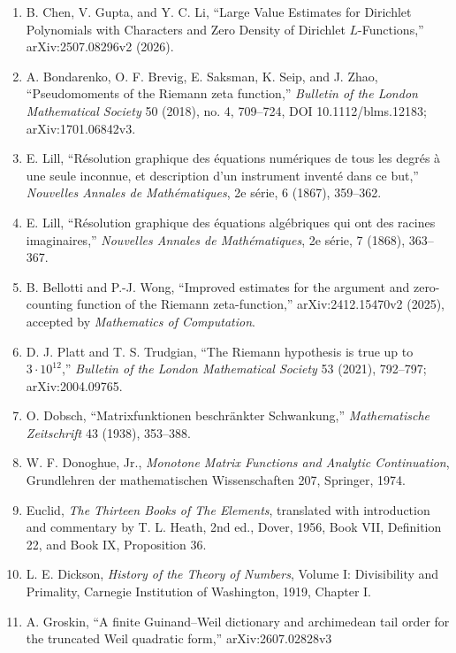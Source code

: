 \documentclass[
  11pt,
]{book}
\begin{document}
\begin{enumerate}
  polynomials,'' \emph{Annals of Mathematics} 203 (2026), no. 2,
  623--675, DOI 10.4007/annals.2026.203.2.6; arXiv:2405.20552v2.
\item
  B. Chen, V. Gupta, and Y. C. Li, ``Large Value Estimates for Dirichlet
  Polynomials with Characters and Zero Density of Dirichlet
  \(L\)-Functions,'' arXiv:2507.08296v2 (2026).
\item
  A. Bondarenko, O. F. Brevig, E. Saksman, K. Seip, and J. Zhao,
  ``Pseudomoments of the Riemann zeta function,'' \emph{Bulletin of the
  London Mathematical Society} 50 (2018), no. 4, 709--724, DOI
  10.1112/blms.12183; arXiv:1701.06842v3.
\item
  E. Lill, ``Résolution graphique des équations numériques de tous les
  degrés à une seule inconnue, et description d'un instrument inventé
  dans ce but,'' \emph{Nouvelles Annales de Mathématiques}, 2e série, 6
  (1867), 359--362.
\item
  E. Lill, ``Résolution graphique des équations algébriques qui ont des
  racines imaginaires,'' \emph{Nouvelles Annales de Mathématiques}, 2e
  série, 7 (1868), 363--367.
\item
  B. Bellotti and P.-J. Wong, ``Improved estimates for the argument and
  zero-counting function of the Riemann zeta-function,''
  arXiv:2412.15470v2 (2025), accepted by \emph{Mathematics of
  Computation}.
\item
  D. J. Platt and T. S. Trudgian, ``The Riemann hypothesis is true up to
  \(3\cdot10^{12}\),'' \emph{Bulletin of the London Mathematical
  Society} 53 (2021), 792--797; arXiv:2004.09765.
\item
  O. Dobsch, ``Matrixfunktionen beschränkter Schwankung,''
  \emph{Mathematische Zeitschrift} 43 (1938), 353--388.
\item
  W. F. Donoghue, Jr., \emph{Monotone Matrix Functions and Analytic
  Continuation}, Grundlehren der mathematischen Wissenschaften 207,
  Springer, 1974.
\item
  Euclid, \emph{The Thirteen Books of The Elements}, translated with
  introduction and commentary by T. L. Heath, 2nd ed., Dover, 1956, Book
  VII, Definition 22, and Book IX, Proposition 36.
\item
  L. E. Dickson, \emph{History of the Theory of Numbers}, Volume I:
  Divisibility and Primality, Carnegie Institution of Washington, 1919,
  Chapter I.
\item
  A. Groskin, ``A finite Guinand--Weil dictionary and archimedean tail
  order for the truncated Weil quadratic form,'' arXiv:2607.02828v3

\end{enumerate}
\end{document}
